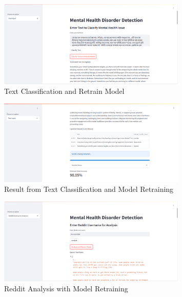 

\pagebreak

\begin{figure}[h!]  
    \centering
    \includegraphics[width=0.8\textwidth]{App Images/14 Interface.png}  
    \caption{Text Classification and Retrain Model}
    \label{101i}  %
\end{figure}

\begin{figure}[h!]  
    \centering
    \includegraphics[width=0.8\textwidth]{App Images/15 Interface.png}  
    \caption{Result from Text Classification and Model Retraining}
    \label{102i}  %
\end{figure}

\begin{figure}[h!]  
    \centering
    \includegraphics[width=0.8\textwidth]{App Images/16 Interface.png}  
    \caption{Reddit Analysis with Model Retraining}
    \label{10i}  %
\end{figure}

